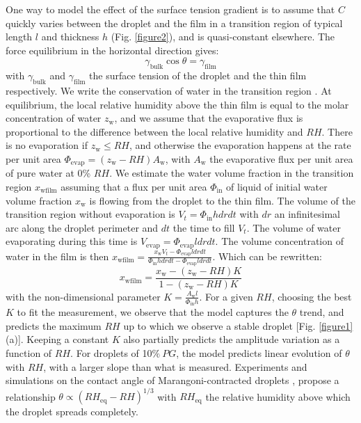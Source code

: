 \documentclass[aps,prl,reprint,superscriptaddress,amsmath,amssymb,]{revtex4-1}
\begin{document}
One way to model the effect of the surface tension gradient is to assume that $C$ quickly varies between the droplet and the film in a transition region of typical length $l$ and thickness $h$ (Fig. \ref{figure2}), and is quasi-constant elsewhere. The force equilibrium in the horizontal direction gives:
\begin{equation}
\gamma_\mathrm{bulk} \cos \theta = \gamma_\mathrm{film}
\end{equation}
with $\gamma_\mathrm{bulk}$ and $\gamma_\mathrm{film}$ the surface tension of the droplet and the thin film respectively. We write the conservation of water in the transition region \cite{Cira-2015}. At equilibrium, the local relative humidity above the thin film is equal to the molar concentration of water $z_\mathrm{w}$, and we assume that the evaporative flux is proportional to the difference between the local relative humidity and $RH$. There is no evaporation if $z_\mathrm{w}\leq RH$, and otherwise the evaporation happens at the rate per unit area  $\Phi_\mathrm{evap}=(z_\mathrm{w}-RH)A_\mathrm{w}$, with $A_\mathrm{w}$ the evaporative flux per unit area of pure water at 0\% $RH$. We estimate the water volume fraction in the transition region $x_\mathrm{wfilm}$ assuming that a flux per unit area $\Phi_\mathrm{in}$ of liquid of initial water volume fraction $x_\mathrm{w}$ is flowing from the droplet to the thin film. The volume of the transition region without evaporation is $V_t=\Phi_\mathrm{in} hdrdt$ with $dr$ an infinitesimal arc along the droplet perimeter and $dt$ the time to fill $V_t$. The volume of water evaporating during this time is $V_\mathrm{evap}=\Phi_\mathrm{evap}ldrdt$. The volume concentration of water in the film is then $x_\mathrm{wfilm}=\frac{x_\mathrm{w} V_t- \Phi_\mathrm{evap} l dr dt}{\Phi_\mathrm{in} h dr dt-\Phi_\mathrm{evap} l dr dt }$. Which can be rewritten:
\begin{equation}
x_\mathrm{wfilm}=\frac{x_\mathrm{w}- \left( z_\mathrm{w}-RH \right) K}{1-\left( z_\mathrm{w}-RH \right) K}
\end{equation}
with the non-dimensional parameter $K= \frac{A_\mathrm{w}l}{\Phi_\mathrm{in} h}$. For a given $RH$, choosing the best $K$ to fit the measurement, we observe that the model captures the $\theta$ trend, and predicts the maximum $RH$ up to which we observe a stable droplet [Fig. \ref{figure1} (a)]. Keeping a constant $K$ also partially predicts the amplitude variation as a function of $RH$. For droplets of 10$\%~PG$, the model predicts linear evolution of $\theta$ with $RH$, with a larger slope than what is measured. Experiments and simulations on the contact angle of Marangoni-contracted droplets  \cite{karpitschka2017marangoni}, propose a relationship $\theta \propto (RH_\mathrm{eq}-RH)^{1/3}$ with $RH_\mathrm{eq}$ the relative humidity above which the droplet spreads completely.\\
\end{document}
